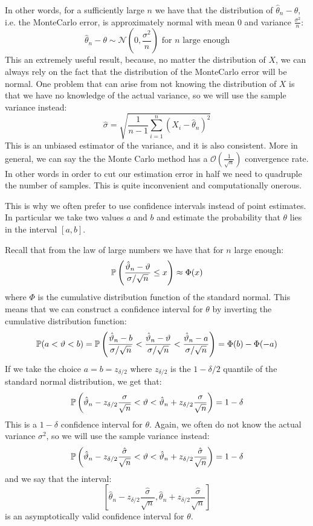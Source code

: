 In other words, for a sufficiently large $n$ we have that the distribution of
$\hat{\theta}_n - \theta$, i.e. the MonteCarlo error, is approximately normal
with mean $0$ and variance $\frac{\sigma^2}{n}$:
\[ \hat{\theta}_n - \theta \sim \mathcal{N}\left(0, \frac{\sigma^2}{n}\right) 
\text{ for } n \text{ large enough}\]
This an extremely useful result, because, no matter the distribution of $X$,
we can always rely on the fact that the distribution of the MonteCarlo error
will be normal.
One problem that can arise from not knowing the distribution of $X$ is that we
have no knowledge of the actual variance, so we will use the sample variance
instead:
\[ \hat{\sigma} = \sqrt{\frac{1}{n-1} \sum_{i=1}^n (X_i - \hat{\theta}_n)^2}\]
This is an unbiased estimator of the variance, and it is also consistent.
More in general, we can say the the Monte Carlo method has a
$\mathcal{O}\left(\frac{1}{\sqrt{n}}\right)$ convergence rate.
In other words in order to cut our estimation error in half we need to 
quadruple the number of samples. This is quite inconvenient and computationally
onerous.

This is why we often prefer to use confidence intervals instead of point
estimates. In particular we take two values $a$ and $b$ and estimate the
probability that $\theta$ lies in the interval $[a,b]$.

Recall that from the law of large numbers we have that for $n$ large enough:
\[ \P \left( \frac{\hat{\theta}_n - \theta}{\sigma / \sqrt{n}} \leq x \right)
\approx \Phi(x) \]
where $\Phi$ is the cumulative distribution function of the standard normal.
This means that we can construct a confidence interval for $\theta$ by
inverting the cumulative distribution function:
\[ \P(a < \theta < b) = \P \left( \frac{\hat{\theta}_n - b}{\sigma/\sqrt{n}}
< \frac{\hat{\theta}_n-\theta}{\sigma/\sqrt{n}} < \frac{\hat{\theta}_n-a}
{\sigma/\sqrt{n}} \right) = \Phi(b) - \Phi(-a) \]
If we take the choice $a = b = z_{\delta/2}$ where $z_{\delta/2}$ is the
$1-\delta/2$ quantile of the standard normal distribution, we get that:
\[ \P \left( \hat{\theta}_n - z_{\delta/2} \frac{\sigma}{\sqrt{n}} < \theta <
\hat{\theta}_n + z_{\delta/2} \frac{\sigma}{\sqrt{n}} \right) = 1 - \delta \]
This is a $1-\delta$ confidence interval for $\theta$.
Again, we often do not know the actual variance $\sigma^2$, so we will use the
sample variance instead:
\[ \P \left( \hat{\theta}_n - z_{\delta/2} \frac{\hat{\sigma}}{\sqrt{n}} <
\theta < \hat{\theta}_n + z_{\delta/2} \frac{\hat{\sigma}}{\sqrt{n}} \right) =
1 - \delta \]
and we say that the interval:
\[ \left[ \hat{\theta}_n - z_{\delta/2} \frac{\hat{\sigma}}{\sqrt{n}},
\hat{\theta}_n + z_{\delta/2} \frac{\hat{\sigma}}{\sqrt{n}} \right] \]
is an asymptotically valid confidence interval for $\theta$.

